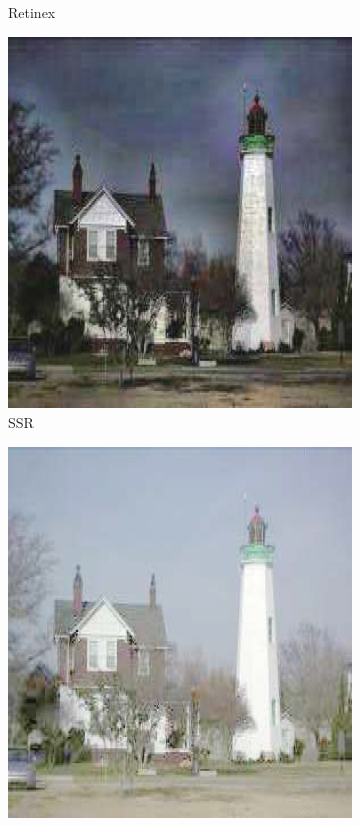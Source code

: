 \documentclass[a4paper]{ctexart}
\begin{document}
\begin{figure}[htb]
\begin{subfigure}{0.18\textwidth}
			\captionsetup{font=scriptsize}
			\caption{Retinex\cite{cooper2004analysis}}
			\label{fig: Retinex Model_Retinex}
		\end{subfigure}
		\begin{subfigure}{0.18\textwidth}
			\includegraphics[width=\linewidth]{picture/LLIE/Retinex Model/SSR}
			\captionsetup{font=scriptsize}
			\caption{SSR}
			\label{fig: Retinex Model_SSR}	
		\end{subfigure}
		\begin{subfigure}{0.18\textwidth}
			\includegraphics[width=\linewidth]{picture/LLIE/Retinex Model/MSR}

\end{subfigure}
\end{figure}
\end{document}
